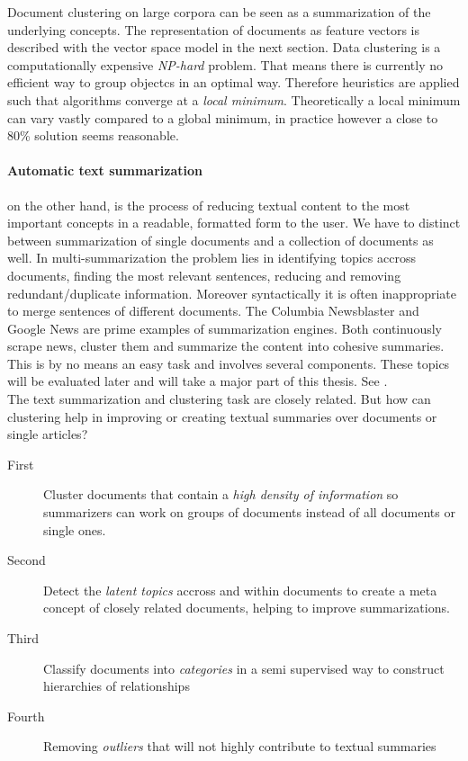   Document clustering on large corpora can be seen as a summarization of the underlying concepts. The representation of documents as feature vectors is described with the vector space model in the next section. Data clustering is a computationally expensive \emph{NP-hard} problem. That means there is currently no efficient way to group objectcs in an optimal way. Therefore heuristics are applied such that algorithms converge at a  \emph{local minimum}. Theoretically a local minimum can vary vastly compared to a global minimum, in practice however a close to 80\% solution seems reasonable.

  \paragraph{Automatic text summarization} on the other hand, is the process of reducing textual content to the most important concepts in a readable, formatted form to the user. \cite{SumEvaluation2001} We have to distinct between summarization of single documents and a collection of documents as well. In multi-summarization the problem lies in identifying topics accross documents, finding the most relevant sentences, reducing and removing redundant/duplicate information. Moreover syntactically it is often inappropriate to merge sentences of different documents. The Columbia Newsblaster and Google News are prime examples of summarization engines. Both continuously scrape news, cluster them and summarize the content into cohesive summaries. This is by no means an easy task and involves several components. These topics will be evaluated later and will take a major part of this thesis. See \cite{NewsBlaster2002, ColumbiaExperimentsSum2002}.\\
  The text summarization and clustering task are closely related. But how can clustering help in improving or creating textual summaries over documents or single articles?
  
  \begin{description}
    \item[First] Cluster documents that contain a \emph{high density of information} so summarizers can work on groups of documents instead of all documents or single ones.
    \item[Second] Detect the \emph{latent topics} accross and within documents to create a meta concept of closely related documents, helping to improve summarizations.
    \item[Third] Classify documents into \emph{categories} in a semi supervised way to construct hierarchies of relationships
    \item[Fourth] Removing \emph{outliers} that will not highly contribute to textual summaries
  \end{description}

